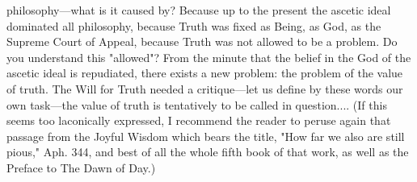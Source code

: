 \documentclass[12pt]{article}
\begin{document}
philosophy---what is it caused by? Because up to the present the ascetic ideal dominated all philosophy, because Truth was fixed as Being, as God, as the Supreme Court of Appeal, because Truth was not allowed to be a problem. Do you understand this "allowed"? From the minute that the belief in the God of the ascetic ideal is repudiated, there exists a new problem: the problem of the value of truth. The Will for Truth needed a critique---let us define by these words our own task---the value of truth is tentatively to be called in question.... (If this seems too laconically expressed, I recommend the reader to peruse again that passage from the Joyful Wisdom which bears the title, "How far we also are still pious," Aph. 344, and best of all the whole fifth book of that work, as well as the Preface to The Dawn of Day.)
\end{document}
